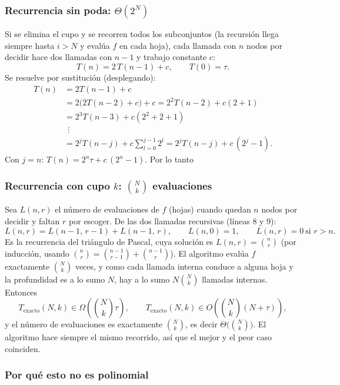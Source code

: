 \subsubsection{Recurrencia sin poda: \texorpdfstring{$\Theta(2^N)$}{Theta(2\^{}N)}}

Si se elimina el cupo y se recorren todos los subconjuntos (la recursión llega siempre hasta $i>N$ y evalúa $f$ en cada hoja), cada llamada con $n$ nodos por decidir hace dos llamadas con $n-1$ y trabajo constante $c$:
\[
T(n) = 2\,T(n-1) + c, \qquad T(0) = \tau .
\]
Se resuelve por sustitución (desplegando):
\begin{align*}
T(n) &= 2T(n-1) + c \\
     &= 2\big(2T(n-2)+c\big) + c = 2^2T(n-2) + c(2+1) \\
     &= 2^3T(n-3) + c(2^2+2+1) \\
     &\ \ \vdots \\
     &= 2^jT(n-j) + c\sum_{l=0}^{j-1}2^l = 2^jT(n-j) + c\,(2^j-1).
\end{align*}
Con $j=n$: $T(n) = 2^n \tau + c\,(2^n - 1)$. Por lo tanto

\subsubsection{Recurrencia con cupo \texorpdfstring{$k$}{k}: \texorpdfstring{$\binom{N}{k}$}{C(N,k)} evaluaciones}

Sea $L(n,r)$ el número de evaluaciones de $f$ (hojas) cuando quedan $n$ nodos por decidir y faltan $r$ por escoger. De las dos llamadas recursivas (líneas 8 y 9):
\[
L(n,r) = L(n-1,\,r-1) + L(n-1,\,r), \qquad L(n,0)=1,\qquad L(n,r)=0 \ \text{si } r>n .
\]
Es la recurrencia del triángulo de Pascal, cuya solución es $L(n,r)=\binom{n}{r}$ (por inducción, usando $\binom{n}{r}=\binom{n-1}{r-1}+\binom{n-1}{r}$). El algoritmo evalúa $f$ exactamente $\binom{N}{k}$ veces, y como cada llamada interna conduce a alguna hoja y la profundidad es a lo sumo $N$, hay a lo sumo $N\binom{N}{k}$ llamadas internas. Entonces
\[
T_{\text{exacto}}(N,k) \in \Omega\!\left(\binom{N}{k}\tau\right), \qquad T_{\text{exacto}}(N,k) \in O\!\left(\binom{N}{k}(N+\tau)\right),
\]
y el número de evaluaciones es exactamente $\binom{N}{k}$, es decir $\Theta\big(\binom{N}{k}\big)$. El algoritmo hace siempre el mismo recorrido, así que el mejor y el peor caso coinciden.

\subsubsection{Por qué esto no es polinomial}

